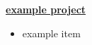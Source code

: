 \textbf{\href{https://github.com/prairir/example}{example project}} \par

\begin{itemize}
    \item example item
\end{itemize}
